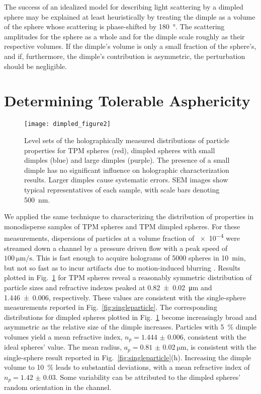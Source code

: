 The success of an idealized model for describing light scattering by a
dimpled sphere may be explained at least heuristically by treating
the dimple as a volume of the sphere whose scattering is phase-shifted
by \SI{180}{\degree}.
The scattering amplitudes for the sphere as a whole and for the dimple
scale roughly as their respective volumes.
If the dimple's volume is only a small fraction of the
sphere's, and if, furthermore, the dimple's contribution is asymmetric,
the perturbation should be negligible.


\section{Determining Tolerable Asphericity}


\begin{figure}[!t]
  \centering
  \texttt{[image: dimpled\_figure2]}
  \caption{Level sets of the holographically measured 
    distributions of particle properties for TPM spheres
    (red), dimpled spheres with small dimples (blue) and
    large dimples (purple).  The presence of a small dimple
    has no significant influence on holographic characterization
    results.  Larger dimples cause systematic errors.
    SEM images show typical representatives of each sample,
    with scale bars denoting \SI{500}{\nm}.}
  \label{fig:distributions}
\end{figure}

We applied the same technique to characterizing the distribution
of properties in monodisperse samples of TPM spheres and 
TPM dimpled spheres.
For these measurements, dispersions of particles at a volume fraction
of \num{e-4} were streamed down a channel by a pressure driven flow
with a peak speed of $\SI{100}{\um\per\second}$.  This is fast enough
to acquire holograms of \num{5000} spheres in \SI{10}{\minute}, but
not so fast as to incur artifacts due to motion-induced blurring
\cite{cheong09,dixon11}.
Results plotted in Fig.~\ref{fig:distributions} for TPM spheres reveal
a reasonably symmetric distribution of particle sizes and refractive
indexes peaked at \SI{0.82(2)}{\um} and \num{1.446(6)}, respectively.
These values are consistent with the single-sphere measurements
reported in Fig.~\ref{fig:singleparticle}.
The corresponding distributions for dimpled spheres plotted in
Fig.~\ref{fig:distributions} become increasingly broad and asymmetric
as the relative size of the dimple increases.
Particles with \SI{5}{\percent} dimple volumes yield a mean refractive
index, $n_p=\num{1.444(6)}$, consistent with the ideal spheres' value.
The mean radius, $a_p=\SI{0.81(2)}{\um}$, is consistent with the
  single-sphere result reported in Fig.~\ref{fig:singleparticle}(h).
Increasing the dimple volume to \SI{10}{\percent} leads to
substantial deviations, with a mean refractive index of
$n_p=\num{1.42(3)}$.
Some variability can be attributed to the dimpled spheres'
random orientation in the channel.

